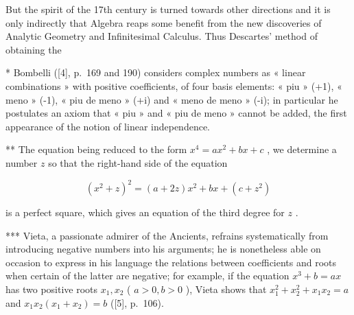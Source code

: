 But the spirit of the 17th century is turned towards other directions and it is only indirectly that Algebra reaps some benefit from the new discoveries of Analytic Geometry and Infinitesimal Calculus. Thus Descartes' method of obtaining the

* Bombelli ({[}4{]}, p.~169 and 190) considers complex numbers as « linear combinations » with positive coefficients, of four basis elements: « piu » (+1), « meno » (-1), « piu de meno » (+i) and « meno de meno » (-i); in particular he postulates an axiom that « piu » and « piu de meno » cannot be added, the first appearance of the notion of linear independence.

** The equation being reduced to the form \(x^4 = ax^2 + bx + c\) , we determine a number \(z\) so that the right-hand side of the equation

\[
(x ^ {2} + z) ^ {2} = (a + 2 z) x ^ {2} + b x + (c + z ^ {2})
\]

is a perfect square, which gives an equation of the third degree for \(z\) .

*** Vieta, a passionate admirer of the Ancients, refrains systematically from introducing negative numbers into his arguments; he is nonetheless able on occasion to express in his language the relations between coefficients and roots when certain of the latter are negative; for example, if the equation \(x^3 + b = ax\) has two positive roots \(x_1, x_2\) ( \(a > 0, b > 0\) ), Vieta shows that \(x_1^2 + x_2^2 + x_1x_2 = a\) and \(x_1x_2(x_1 + x_2) = b\) ({[}5{]}, p.~106).

